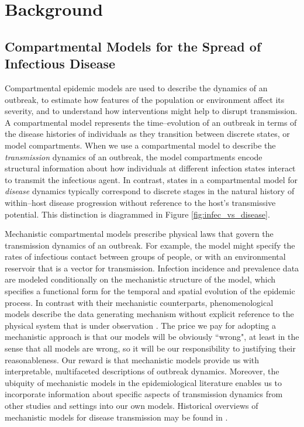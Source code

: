\chapter{Background}
\label{chap:background}

\section{Compartmental Models for the Spread of Infectious Disease}
\label{sec:outbreak_models}

Compartmental epidemic models are used to describe the dynamics of an outbreak, to estimate how features of the population or environment affect its severity, and to understand how interventions might help to disrupt transmission. A compartmental model represents the time--evolution of an outbreak in terms of the disease histories of individuals as they transition between discrete states, or model compartments. When we use a compartmental model to describe the \textit{transmission} dynamics of an outbreak, the model compartments encode structural information about how individuals at different infection states interact to transmit the infectious agent. In contrast, states in a compartmental model for \textit{disease} dynamics typically correspond to discrete stages in the natural history of within--host disease progression without reference to the host's transmissive potential. This distinction is diagrammed in Figure \ref{fig:infec_vs_disease}.

Mechanistic compartmental models prescribe physical laws that govern the transmission dynamics of an outbreak. For example, the model might specify the rates of infectious contact between groups of people, or with an environmental reservoir that is a vector for transmission. Infection incidence and prevalence data are modeled conditionally on the mechanistic structure of the model, which specifies a functional form for the temporal and spatial evolution of the epidemic process. In contrast with their mechanistic counterparts, phenomenological models describe the data generating mechanism without explicit reference to the physical system that is under observation \cite{chowell2017fitting}. The price we pay for adopting a mechanistic approach is that our models will be obviously ``wrong", at least in the sense that all models are wrong, so it will be our responsibility to justifying their reasonableness. Our reward is that mechanistic models provide us with interpretable, multifaceted descriptions of outbreak dynamics. Moreover, the ubiquity of mechanistic models in the epidemiological literature enables us to incorporate information about specific aspects of transmission dynamics from other studies and settings into our own models. Historical overviews of mechanistic models for disease transmission may be found in \cite{anderson1992infectious,brauer2017mathematical,keeling2008,lessler2016mechanistic}.

